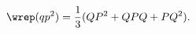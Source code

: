 \begin{equation}
        \label{eq:WeylExample}
        \wrep(qp^2) = \frac{1}{3}(QP^2 + QPQ + PQ^2).
    \end{equation}

